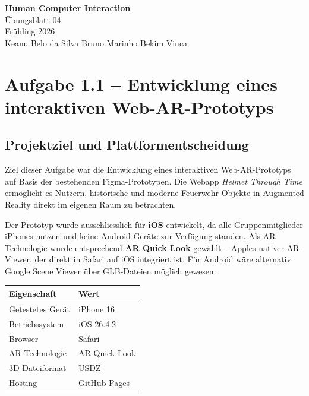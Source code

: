 \documentclass[11pt,a4paper]{article}
\begin{document}
\setlength{\headsep}{30pt}

\begin{center}
{\Large \textbf{Human Computer Interaction}} \\[6pt]
{\large Übungsblatt 04} \\[4pt]
Frühling 2026 \\[10pt]
Keanu Belo da Silva \quad Bruno Marinho \quad Bekim Vinca
\end{center}

\vspace{1cm}

\section*{Aufgabe 1.1 -- Entwicklung eines interaktiven Web-AR-Prototyps}

\subsection*{Projektziel und Plattformentscheidung}

Ziel dieser Aufgabe war die Entwicklung eines interaktiven Web-AR-Prototyps auf Basis der bestehenden Figma-Prototypen. Die Webapp \textit{Helmet Through Time} ermöglicht es Nutzern, historische und moderne Feuerwehr-Objekte in Augmented Reality direkt im eigenen Raum zu betrachten.

Der Prototyp wurde ausschliesslich für \textbf{iOS} entwickelt, da alle Gruppenmitglieder iPhones nutzen und keine Android-Geräte zur Verfügung standen. Als AR-Technologie wurde entsprechend \textbf{AR Quick Look} gewählt -- Apples nativer AR-Viewer, der direkt in Safari auf iOS integriert ist. Für Android wäre alternativ Google Scene Viewer über GLB-Dateien möglich gewesen.

\begin{center}
\begin{tabular}{ll}
\toprule
\textbf{Eigenschaft} & \textbf{Wert} \\
\midrule
Getestetes Gerät    & iPhone 16 \\
Betriebssystem      & iOS 26.4.2 \\
Browser             & Safari \\
AR-Technologie      & AR Quick Look \\
3D-Dateiformat      & USDZ \\
Hosting             & GitHub Pages \\
\bottomrule
\end{tabular}
\end{center}
\end{document}
